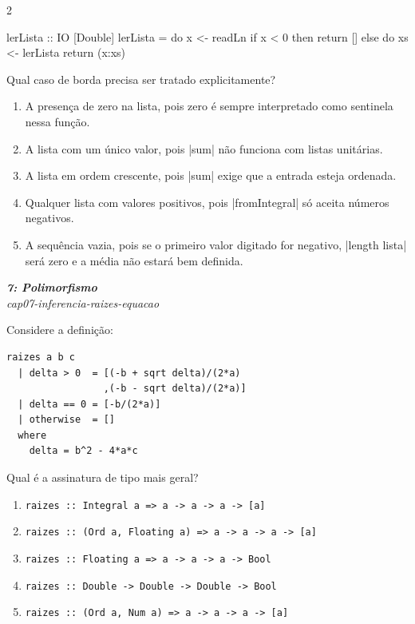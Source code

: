 \documentclass[a4paper,10pt,brazil]{article}
\begin{document}
\begin{multicols}{2}
\begin{haskellcode}
lerLista :: IO [Double]
lerLista = do
  x <- readLn
  if x < 0
    then return []
    else do
      xs <- lerLista
      return (x:xs)
\end{haskellcode}

Qual caso de borda precisa ser tratado explicitamente?

\begin{enumerate}
  \item A presença de zero na lista, pois zero é sempre interpretado como sentinela nessa função.

  \item A lista com um único valor, pois \haskellinline|sum| não funciona com listas unitárias.

  \item A lista em ordem crescente, pois \haskellinline|sum| exige que a entrada esteja ordenada.

  \item Qualquer lista com valores positivos, pois \haskellinline|fromIntegral| só aceita números negativos.

  \item A sequência vazia, pois se o primeiro valor digitado for negativo, \haskellinline|length lista| será zero e a média não estará bem definida.


\end{enumerate}

\begin{flushright}
  \footnotesize
  \textit{\textbf{7: Polimorfismo}}\\
  \textit{cap07-inferencia-raizes-equacao}\\

\end{flushright}
Considere a definição:

\begin{verbatim}
raizes a b c
  | delta > 0  = [(-b + sqrt delta)/(2*a)
                 ,(-b - sqrt delta)/(2*a)]
  | delta == 0 = [-b/(2*a)]
  | otherwise  = []
  where
    delta = b^2 - 4*a*c
\end{verbatim}

Qual é a assinatura de tipo mais geral?

\begin{enumerate}
  \item \texttt{raizes :: Integral a => a -> a -> a -> [a]}
  \item \texttt{raizes :: (Ord a, Floating a) => a -> a -> a -> [a]}
  \item \texttt{raizes :: Floating a => a -> a -> a -> Bool}
  \item \texttt{raizes :: Double -> Double -> Double -> Bool}
  \item \texttt{raizes :: (Ord a, Num a) => a -> a -> a -> [a]}


\end{enumerate}
\end{multicols}
\end{document}
